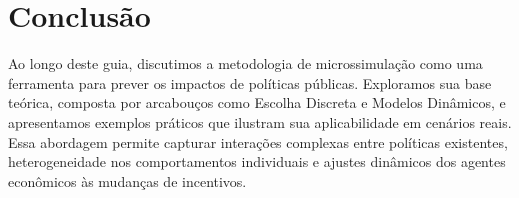 \documentclass[12pt, a4paper, openany]{book}
\numberwithin{equation}{chapter}
\numberwithin{table}{chapter}
\numberwithin{figure}{chapter}
\theoremstyle{break}
\begin{document}


\chapter{Conclusão}

Ao longo deste guia, discutimos a metodologia de microssimulação como uma ferramenta para prever os impactos de políticas públicas. Exploramos sua base teórica, composta por arcabouços como Escolha Discreta e Modelos Dinâmicos, e apresentamos exemplos práticos que ilustram sua aplicabilidade em cenários reais. Essa abordagem permite capturar interações complexas entre políticas existentes, heterogeneidade nos comportamentos individuais e ajustes dinâmicos dos agentes econômicos às mudanças de incentivos.
\end{document}
